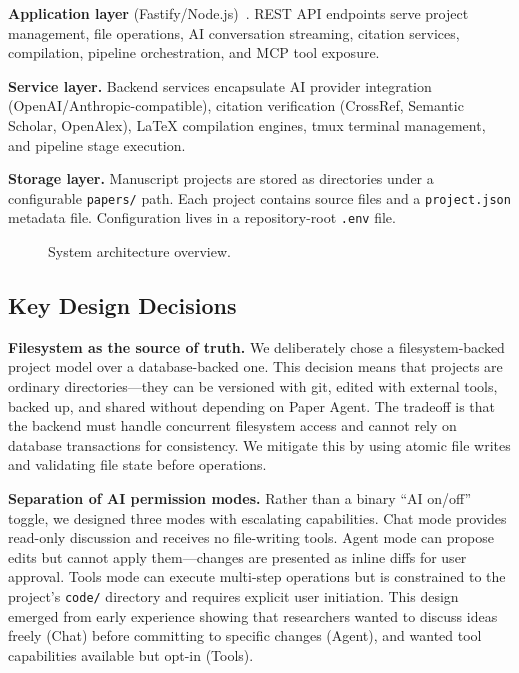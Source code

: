 \documentclass[11pt,a4paper]{article}
\newcommand{\software}{Paper Agent}
\begin{document}
\textbf{Application layer} (Fastify/Node.js)~\cite{fastify,nodejs}. REST API
endpoints serve project management, file operations, AI conversation streaming,
citation services, compilation, pipeline orchestration, and MCP tool exposure.

\textbf{Service layer.} Backend services encapsulate AI provider integration
(OpenAI/Anthropic-compatible), citation verification (CrossRef, Semantic
Scholar, OpenAlex), \LaTeX{} compilation engines, tmux terminal management, and
pipeline stage execution.

\textbf{Storage layer.} Manuscript projects are stored as directories under a
configurable \texttt{papers/} path. Each project contains source files and a
\texttt{project.json} metadata file. Configuration lives in a repository-root
\texttt{.env} file.

\begin{figure}[htbp]
  \centering
  \caption{System architecture overview.}
  \label{fig:architecture}
\end{figure}

\subsection{Key Design Decisions}

\textbf{Filesystem as the source of truth.} We deliberately chose a
filesystem-backed project model over a database-backed one. This decision means
that projects are ordinary directories---they can be versioned with git, edited
with external tools, backed up, and shared without depending on \software{}.
The tradeoff is that the backend must handle concurrent filesystem access and
cannot rely on database transactions for consistency. We mitigate this by using
atomic file writes and validating file state before operations.

\textbf{Separation of AI permission modes.} Rather than a binary ``AI on/off''
toggle, we designed three modes with escalating capabilities. Chat mode
provides read-only discussion and receives no file-writing tools. Agent mode
can propose edits but cannot apply them---changes are presented as inline diffs
for user approval. Tools mode can execute multi-step operations but is
constrained to the project's \texttt{code/} directory and requires explicit
user initiation. This design emerged from early experience showing that
researchers wanted to discuss ideas freely (Chat) before committing to specific
changes (Agent), and wanted tool capabilities available but opt-in (Tools).
\end{document}
